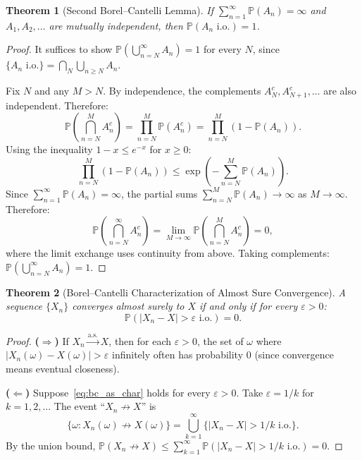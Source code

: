 \documentclass[11pt,a4paper]{article}
\theoremstyle{definition}
\theoremstyle{plain}
\newtheorem{theorem}{Theorem}[section]
\theoremstyle{remark}
\newcommand{\Prob}{\mathbb{P}}
\newcommand{\cas}{\xrightarrow{\text{a.s.}}}
\begin{document}
\begin{keyresult}
\begin{theorem}[Second Borel--Cantelli Lemma]
\label{thm:bc2}
If $\sum_{n=1}^\infty \Prob(A_n) = \infty$ and $A_1, A_2, \ldots$ are mutually independent, then $\Prob(A_n \text{ i.o.}) = 1$.
\end{theorem}
\end{keyresult}

\begin{proof}
It suffices to show $\Prob(\bigcup_{n=N}^\infty A_n) = 1$ for every $N$, since $\{A_n \text{ i.o.}\} = \bigcap_N \bigcup_{n \geq N} A_n$.

Fix $N$ and any $M > N$. By independence, the complements $A_N^c, A_{N+1}^c, \ldots$ are also independent. Therefore:
\begin{equation}
    \Prob\!\left(\bigcap_{n=N}^M A_n^c\right) = \prod_{n=N}^M \Prob(A_n^c) = \prod_{n=N}^M (1 - \Prob(A_n)).
\end{equation}
Using the inequality $1 - x \leq e^{-x}$ for $x \geq 0$:
\begin{equation}
    \prod_{n=N}^M (1 - \Prob(A_n)) \leq \exp\!\left(-\sum_{n=N}^M \Prob(A_n)\right).
\end{equation}
Since $\sum_{n=1}^\infty \Prob(A_n) = \infty$, the partial sums $\sum_{n=N}^M \Prob(A_n) \to \infty$ as $M \to \infty$. Therefore:
\begin{equation}
    \Prob\!\left(\bigcap_{n=N}^\infty A_n^c\right) = \lim_{M \to \infty} \Prob\!\left(\bigcap_{n=N}^M A_n^c\right) = 0,
\end{equation}
where the limit exchange uses continuity from above. Taking complements: $\Prob(\bigcup_{n=N}^\infty A_n) = 1$.
\end{proof}

\begin{theorem}[Borel--Cantelli Characterization of Almost Sure Convergence]
\label{thm:bc_as}
A sequence $\{X_n\}$ converges almost surely to $X$ if and only if for every $\varepsilon > 0$:
\begin{equation}
    \Prob\!\left(|X_n - X| > \varepsilon \text{ i.o.}\right) = 0.
    \label{eq:bc_as_char}
\end{equation}
\end{theorem}

\begin{proof}
\textbf{($\Rightarrow$)} If $X_n \cas X$, then for each $\varepsilon > 0$, the set of $\omega$ where $|X_n(\omega) - X(\omega)| > \varepsilon$ infinitely often has probability $0$ (since convergence means eventual closeness).

\textbf{($\Leftarrow$)} Suppose~\eqref{eq:bc_as_char} holds for every $\varepsilon > 0$. Take $\varepsilon = 1/k$ for $k = 1, 2, \ldots$ The event ``$X_n \not\to X$'' is
\begin{equation}
    \{\omega : X_n(\omega) \not\to X(\omega)\} = \bigcup_{k=1}^\infty \{|X_n - X| > 1/k \text{ i.o.}\}.
\end{equation}
By the union bound, $\Prob(X_n \not\to X) \leq \sum_{k=1}^\infty \Prob(|X_n - X| > 1/k \text{ i.o.}) = 0$.
\end{proof}
\end{document}
